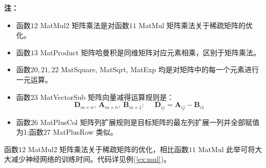 \documentclass[UTF-8]{progbookcn}
\begin{document}
\noindent\textbf{注：}
\begin{itemize}
  \item 函数${12}$ MatMul2 矩阵乘法是对函数$11$ MatMul 矩阵乘法关于稀疏矩阵的优化\cite{DBLP:conf/aiccsa/EmadHM05}。
  \item  函数${13}$ MatProduct 矩阵哈曼积是同维矩阵对应元素相乘，区别于矩阵乘法。
  \item 函数$20,21,22$ MatSquare, MatSqrt, MatExp 均是对矩阵中的每一个元素进行一元运算。
  \item 函数${23}$ MatVectorSub 矩阵向量减得运算规则是：$$\bm{D}_{m\times n},~ \bm{A}_{m\times n},~ \bm{B}_{m\times 1}: ~~~~~~\bm{D}_{ij} = \bm{A}_{ij} - \bm{B}_{i1}$$
  \item 函数${26}$ MatPlusCol 矩阵列扩展规则是目标矩阵的最左列扩展一列并全部赋值为1;函数${27}$ MatPlusRow 类似。
\end{itemize}

\begin{information}
函数$12$ MatMul2 矩阵乘法关于稀疏矩阵的优化，相比函数$11$ MatMul 此举可将大大减少神经网络的训练时间。代码详见例(\ref{ex:mul})。
\end{information}
\end{document}

